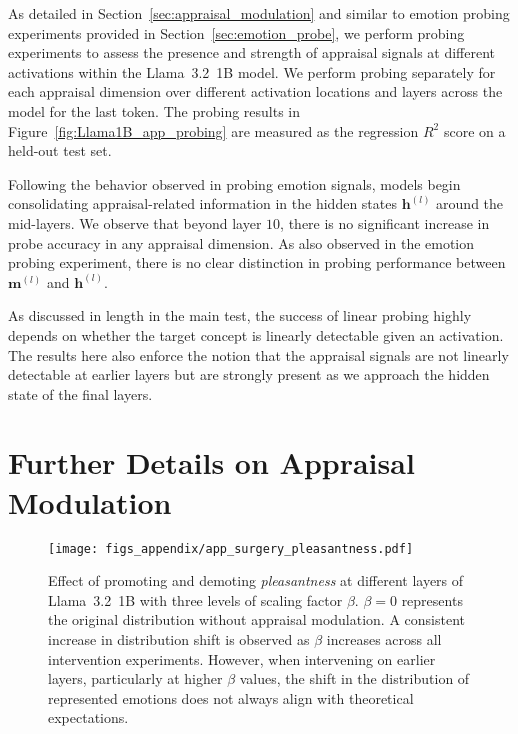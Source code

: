 As detailed in Section~\ref{sec:appraisal_modulation} and similar to emotion probing experiments provided in Section~\ref{sec:emotion_probe}, we perform probing experiments to assess the presence and strength of appraisal signals at different activations within the Llama~3.2~1B model. We perform probing separately for each appraisal dimension over different activation locations and layers across the model for the last token. The probing results in Figure~\ref{fig:Llama1B_app_probing} are measured as the regression $R^2$ score on a held-out test set.

Following the behavior observed in probing emotion signals, models begin consolidating appraisal-related information in the hidden states $\mathbf{h}^{(l)}$ around the mid-layers. We observe that beyond layer $10$, there is no significant increase in probe accuracy in any appraisal dimension. As also observed in the emotion probing experiment, there is no clear distinction in probing performance between \( \mathbf{m}^{(l)} \) and \( \mathbf{h}^{(l)} \). 

As discussed in length in the main test, the success of linear probing highly depends on whether the target concept is linearly detectable given an activation. The results here also enforce the notion that the appraisal signals are not linearly detectable at earlier layers but are strongly present as we approach the hidden state of the final layers.

\section{Further Details on Appraisal Modulation} \label{app:appraisal_modulation}

\begin{figure*}[bht]
    \centering
    \texttt{[image: figs\_appendix/app\_surgery\_pleasantness.pdf]}
  \caption{Effect of promoting and demoting \textit{pleasantness} at different layers of Llama~3.2~1B with three levels of scaling factor $\beta$. $\beta = 0$ represents the original distribution without appraisal modulation. A consistent increase in distribution shift is observed as $\beta$ increases across all intervention experiments. However, when intervening on earlier layers, particularly at higher $\beta$ values, the shift in the distribution of represented emotions does not always align with theoretical expectations.}
  \label{fig:appraisal_layers_pleasantness}
\end{figure*} 

